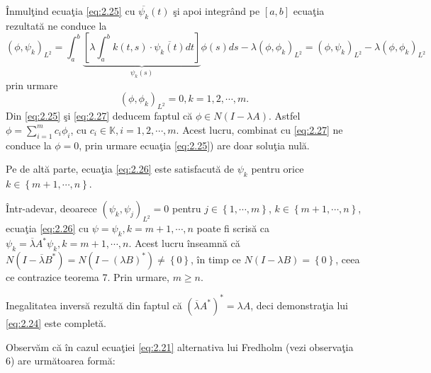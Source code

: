 \documentclass[a4paper,12pt,oneside]{report}
\begin{document}
\^{I}nmul\c{t}ind ecua\c{t}ia \ref{eq:2.25} cu \(\overline{\psi _{k}}\left ( t \right )\) \c{s}i apoi integr\^{a}nd pe \(\left [ a,b \right ]\) ecua\c{t}ia rezultat\u{a} ne conduce la
\begin{displaymath}
\left ( \phi ,\psi _{k} \right )_{L^{2}} = \int_{a}^{b}\underbrace{\left [ \lambda \int_{a}^{b}k\left ( t,s \right ) \cdot \overline{\psi _{k}\left ( t \right )}dt \right ]}_{\psi _{k}\left ( s \right )}\phi \left ( s \right )ds - \lambda \left ( \phi ,\phi _{k} \right )_{L^{2}} = \left ( \phi ,\psi _{k} \right )_{L^{2}} - \lambda \left ( \phi ,\phi _{k} \right )_{L^{2}}
\end{displaymath}
prin urmare
\begin{displaymath}
\left ( \phi ,\phi _{k} \right )_{L^{2}} = 0, k=1,2,\cdots,m. \label{eq:2.27} \tag{2.27}
\end{displaymath}
Din \ref{eq:2.25} \c{s}i \ref{eq:2.27} deducem faptul c\u{a} \(\phi \in N\left ( I-\lambda A \right )\). Astfel \(\phi = \sum_{i=1}^{m}c_{i}\phi _{i}\), cu \(c_{i}\in\mathbb{K}, i = 1,2,\cdots,m\). Acest lucru, combinat cu \ref{eq:2.27} ne conduce la \(\phi = 0\), prin urmare ecua\c{t}ia \ref{eq:2.25}) are doar solu\c{t}ia nul\u{a}.

Pe de alt\u{a} parte, ecua\c{t}ia \ref{eq:2.26} este satisfacut\u{a} de \(\psi _{k}\) pentru orice \(k\in \left \{ m+1,\cdots, n \right \}\).

\^{I}ntr-adevar, deoarece \(\left ( \psi _{k} , \psi _{j}\right )_{L^{2}} = 0\) pentru \(j \in \left \{ 1,\cdots,m \right \}\),  \(k\in \left \{ m+1,\cdots,n \right \}\), ecua\c{t}ia \ref{eq:2.26} cu \(\psi =\psi _{k}, k = m+1,\cdots,n\) poate fi scris\u{a} ca \(\psi _{k} = \overline{\lambda }A^{\ast }\psi _{k}, k = m+1,\cdots,n\). Acest lucru \^{i}nseamn\u{a} c\u{a} \(N\left ( I - \overline{\lambda }B^{\ast } \right ) = N\left ( I - \left (\lambda B   \right )^{\ast } \right )\neq \left \{ 0 \right \}\), \^{i}n timp ce \(N\left ( I - \lambda B \right ) = \left \{ 0 \right \}\), ceea ce contrazice teorema 7. Prin urmare, \(m\geq n\).

Inegalitatea invers\u{a} rezult\u{a} din faptul c\u{a} \(\left ( \overline{\lambda }A^{\ast } \right )^{\ast } = \lambda A\), deci demonstra\c{t}ia lui \ref{eq:2.24} este complet\u{a}.


Observ\u{a}m c\u{a} \^{i}n cazul ecua\c{t}iei \ref{eq:2.21}  alternativa lui Fredholm (vezi observa\c{t}ia 6) are urm\u{a}toarea form\u{a}:
\end{document}
